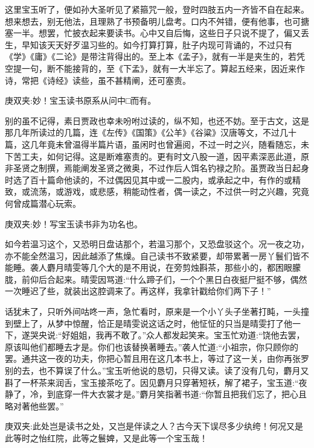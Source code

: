 \begin{parag}
    这里宝玉听了，便如孙大圣听见了紧箍咒一般，登时四肢五内一齐皆不自在起来。想来想去，别无他法，且理熟了书预备明儿盘考。口内不舛错，便有他事，也可搪塞一半。想罢，忙披衣起来要读书。心中又自后悔，这些日子只说不提了，偏又丢生，早知该天天好歹温习些的。如今打算打算，肚子内现可背诵的，不过只有《学》《庸》《二论》是带注背得出的。至上本《孟子》，就有一半是夹生的，若凭空提一句，断不能接背的，至《下孟》，就有一大半忘了。算起五经来，因近来作诗，常把《诗经》读些，虽不甚精阐，还可塞责。\begin{note}庚双夹:妙！宝玉读书原系从问中□而有。\end{note}别的虽不记得，素日贾政也幸未吩咐过读的，纵不知，也还不妨。至于古文，这是那几年所读过的几篇，连《左传》《国策》《公羊》《谷粱》汉唐等文，不过几十篇，这几年竟未曾温得半篇片语，虽闲时也曾遍阅，不过一时之兴，随看随忘，未下苦工夫，如何记得。这是断难塞责的。更有时文八股一道，因平素深恶此道，原非圣贤之制撰，焉能阐发圣贤之微奥，不过作后人饵名钓禄之阶。虽贾政当日起身时选了百十篇命他读的，不过偶因见其中或一二股内，或承起之中，有作的或精致，或流荡，或游戏，或悲感，稍能动性者，偶一读之，不过供一时之兴趣，究竟何曾成篇潜心玩索。\begin{note}庚双夹:妙！写宝玉读书非为功名也。\end{note}如今若温习这个，又恐明日盘诘那个，若温习那个，又恐盘驳这个。况一夜之功，亦不能全然温习，因此越添了焦燥。自己读书不致紧要，却带累著一房丫鬟们皆不能睡。袭人麝月晴雯等几个大的是不用说，在旁剪烛斟茶，那些小的，都困眼朦胧，前仰后合起来。晴雯因骂道:“什么蹄子们，一个个黑日白夜挺尸挺不够，偶然一次睡迟了些，就装出这腔调来了。再这样，我拿针戳给你们两下子！”
\end{parag}


\begin{parag}
    话犹未了，只听外间咕咚一声，急忙看时，原来是一个小丫头子坐著打盹，一头撞到壁上了，从梦中惊醒，恰正是晴雯说这话之时，他怔怔的只当是晴雯打了他一下，遂哭央说:“好姐姐，我再不敢了。”众人都发起笑来。宝玉忙劝道:“饶他去罢，原该叫他们都睡去才是。你们也该替换著睡去。”袭人忙道:“小祖宗，你只顾你的罢。通共这一夜的功夫，你把心暂且用在这几本书上，等过了这一关，由你再张罗别的去，也不算误了什么。”宝玉听他说的恳切，只得又读。读了没有几句，麝月又斟了一杯茶来润舌，宝玉接茶吃了。因见麝月只穿著短袄，解了裙子，宝玉道:“夜静了，冷，到底穿一件大衣裳才是。”麝月笑指著书道:“你暂且把我们忘了，把心且略对著他些罢。”\begin{note}庚双夹:此处岂是读书之处，又岂是伴读之人？古今天下误尽多少纨绔！何况又是此等时之怡红院，此等之鬟婢，又是此等一个宝玉哉！\end{note}
\end{parag}


